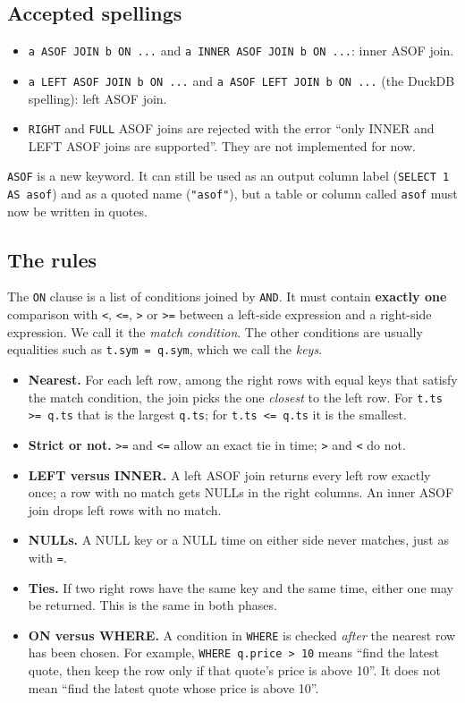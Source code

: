 \documentclass[11pt,a4paper]{article}
\newcommand{\code}[1]{\texttt{#1}}
\begin{document}
\subsection{Accepted spellings}

\begin{itemize}
  \item \code{a ASOF JOIN b ON ...} and \code{a INNER ASOF JOIN b ON ...}: inner ASOF join.
  \item \code{a LEFT ASOF JOIN b ON ...} and \code{a ASOF LEFT JOIN b ON ...} (the
        DuckDB spelling): left ASOF join.
  \item \code{RIGHT} and \code{FULL} ASOF joins are rejected with the error ``only INNER
        and LEFT ASOF joins are supported''. They are not implemented for now.
\end{itemize}

\code{ASOF} is a new keyword. It can still be used as an output column label
(\code{SELECT 1 AS asof}) and as a quoted name (\code{"asof"}), but a table or column
called \code{asof} must now be written in quotes.

\subsection{The rules}

The \code{ON} clause is a list of conditions joined by \code{AND}. It must contain
\textbf{exactly one} comparison with \code{<}, \code{<=}, \code{>} or \code{>=} between a
left-side expression and a right-side expression. We call it the \emph{match condition}.
The other conditions are usually equalities such as \code{t.sym = q.sym}, which we call
the \emph{keys}.

\begin{itemize}
  \item \textbf{Nearest.} For each left row, among the right rows with equal keys that
        satisfy the match condition, the join picks the one \emph{closest} to the left
        row. For \code{t.ts >= q.ts} that is the largest \code{q.ts}; for
        \code{t.ts <= q.ts} it is the smallest.
  \item \textbf{Strict or not.} \code{>=} and \code{<=} allow an exact tie in time;
        \code{>} and \code{<} do not.
  \item \textbf{LEFT versus INNER.} A left ASOF join returns every left row exactly once;
        a row with no match gets NULLs in the right columns. An inner ASOF join drops
        left rows with no match.
  \item \textbf{NULLs.} A NULL key or a NULL time on either side never matches, just as
        with \code{=}.
  \item \textbf{Ties.} If two right rows have the same key and the same time, either one
        may be returned. This is the same in both phases.
  \item \textbf{ON versus WHERE.} A condition in \code{WHERE} is checked \emph{after} the
        nearest row has been chosen. For example, \code{WHERE q.price > 10} means ``find
        the latest quote, then keep the row only if that quote's price is above 10''. It
        does not mean ``find the latest quote whose price is above 10''.
\end{itemize}
\end{document}

